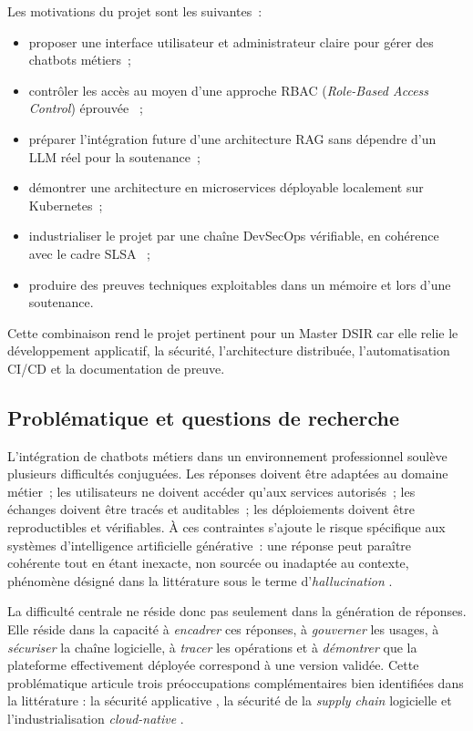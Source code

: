 Les motivations du projet sont les suivantes~:
\begin{itemize}
    \item proposer une interface utilisateur et administrateur claire pour gérer des chatbots métiers~;
    \item contrôler les accès au moyen d'une approche RBAC (\textit{Role-Based Access Control}) éprouvée \cite{sandhu_rbac_1996,nist_rbac_standard}~;
    \item préparer l'intégration future d'une architecture RAG sans dépendre d'un LLM réel pour la soutenance~;
    \item démontrer une architecture en microservices déployable localement sur Kubernetes~;
    \item industrialiser le projet par une chaîne DevSecOps vérifiable, en cohérence avec le cadre SLSA \cite{slsa_spec_v1}~;
    \item produire des preuves techniques exploitables dans un mémoire et lors d'une soutenance.
\end{itemize}

Cette combinaison rend le projet pertinent pour un Master DSIR car elle relie le développement applicatif, la sécurité, l'architecture distribuée, l'automatisation CI/CD et la documentation de preuve.

\subsection{Problématique et questions de recherche}

L'intégration de chatbots métiers dans un environnement professionnel soulève plusieurs difficultés conjuguées. Les réponses doivent être adaptées au domaine métier~; les utilisateurs ne doivent accéder qu'aux services autorisés~; les échanges doivent être tracés et auditables~; les déploiements doivent être reproductibles et vérifiables. À ces contraintes s'ajoute le risque spécifique aux systèmes d'intelligence artificielle générative~: une réponse peut paraître cohérente tout en étant inexacte, non sourcée ou inadaptée au contexte, phénomène désigné dans la littérature sous le terme d'\textit{hallucination} \cite{ji_hallucination_survey,bommasani_foundation_models}.

La difficulté centrale ne réside donc pas seulement dans la génération de réponses. Elle réside dans la capacité à \textit{encadrer} ces réponses, à \textit{gouverner} les usages, à \textit{sécuriser} la chaîne logicielle, à \textit{tracer} les opérations et à \textit{démontrer} que la plateforme effectivement déployée correspond à une version validée. Cette problématique articule trois préoccupations complémentaires bien identifiées dans la littérature : la sécurité applicative \cite{owasp_llm_top10}, la sécurité de la \textit{supply chain} logicielle \cite{slsa_spec_v1,ohm_supply_chain_attacks_2020} et l'industrialisation \textit{cloud-native} \cite{burns_kubernetes_2022}.

